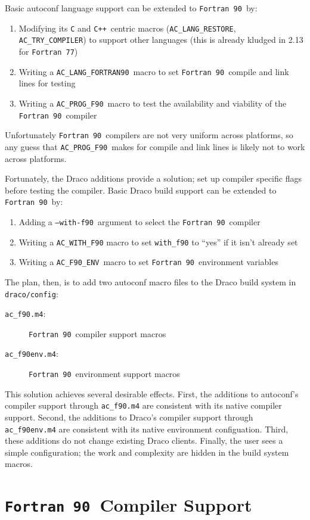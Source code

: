 \documentclass[11pt]{nmemo}
\newcommand{\fninety}{\texttt{Fortran~90}}
\newcommand{\cpp}{\texttt{C++}}
\newcommand{\withfninety}{\texttt{--with-f90}}
\newcommand{\fninetyenv}{\texttt{AC\_F90\_ENV}}
\newcommand{\langfninety}{\texttt{AC\_LANG\_FORTRAN90}}
\newcommand{\progfninety}{\texttt{AC\_PROG\_F90}}
\newcommand{\fseventyseven}{\texttt{Fortran 77}}
\newcommand{\langrestore}{\texttt{AC\_LANG\_RESTORE}}
\begin{document}
Basic autoconf language support can be extended to \fninety\ by:
\begin{enumerate}
\item Modifying its \texttt{C} and \cpp\ centric macros (\langrestore,
\texttt{AC\_TRY\_COMPILER}) to support other languages (this is
already kludged in 2.13 for \fseventyseven)
\item Writing a \langfninety\ macro to set \fninety\ compile and link
lines for testing
\item Writing a \progfninety\ macro to test the availability and
viability of the \fninety\ compiler
\end{enumerate}
Unfortunately \fninety\ compilers are not very uniform across
platforms, so any guess that \progfninety\ makes for compile and link
lines is likely not to work across platforms.  

Fortunately, the Draco additions provide a solution; set up compiler
specific flags before testing the compiler.  Basic Draco build support
can be extended to \fninety\ by:
\begin{enumerate}
\item Adding a \withfninety\ argument to select the \fninety\ compiler
\item Writing a \texttt{AC\_WITH\_F90} macro to set \texttt{with\_f90}
to ``yes'' if it isn't already set
\item Writing a \fninetyenv\ macro to set \fninety\ environment
variables
\end{enumerate}

The plan, then, is to add two autoconf macro files to the Draco build
system in \texttt{draco/config}:
\begin{description}
\item[\texttt{ac\_f90.m4}:] \fninety\ compiler support macros
\item[\texttt{ac\_f90env.m4}:] \fninety\ environment support macros
\end{description}
This solution achieves several desirable effects.  First, the
additions to autoconf's compiler support through \texttt{ac\_f90.m4}
are consistent with its native compiler support.  Second, the
additions to Draco's compiler support through \texttt{ac\_f90env.m4}
are consistent with its native environment configuation.  Third, these
additions do not change existing Draco clients.  Finally, the user
sees a simple configuration; the work and complexity are hidden in the
build system macros.

\section{\fninety\ Compiler Support}
\end{document}
